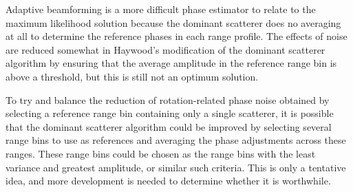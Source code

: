 Adaptive beamforming is a more difficult phase estimator to relate to the
maximum likelihood solution because the dominant scatterer does no
averaging at all to determine the reference phases in each range profile. 
The effects of noise are reduced somewhat in Haywood's modification
\cite{Hay92a} of the dominant scatterer algorithm by ensuring that the
average amplitude in the reference range bin is above a threshold, but this
is still not an optimum solution.  

To try and balance the reduction of rotation-related phase noise obtained
by selecting a reference range bin containing only a single scatterer, it
is possible that the dominant scatterer algorithm could be improved by
selecting several range bins to use as references and averaging the phase
adjustments across these ranges.  These range bins could be chosen as the
range bins with the least variance and greatest amplitude, or similar such
criteria.  This is only a tentative idea, and more development is needed to
determine whether it is worthwhile.
